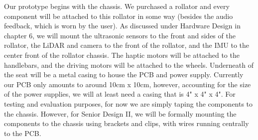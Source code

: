 \noindent Our prototype begins with the chassis. We purchased a rollator and every component will be attached to this rollator in some way (besides the audio feedback, which is worn by the user). As discussed under Hardware Design in chapter 6, we will mount the ultrasonic sensors to the front and sides of the rollator, the LiDAR and camera to the front of the rollator, and the IMU to the center front of the rollator chassis. The haptic motors will be attached to the handlebars, and the driving motors will be attached to the wheels. Underneath of the seat will be a metal casing to house the PCB and power supply. Currently our PCB only amounts to around 10cm x 10cm, however, accounting for the size of the power supplies, we will at least need a casing that is 4" x 4" x 4". For testing and evaluation purposes, for now we are simply taping the components to the chassis. However, for Senior Design II, we will be formally mounting the components to the chassis using brackets and clips, with wires running centrally to the PCB.\\
